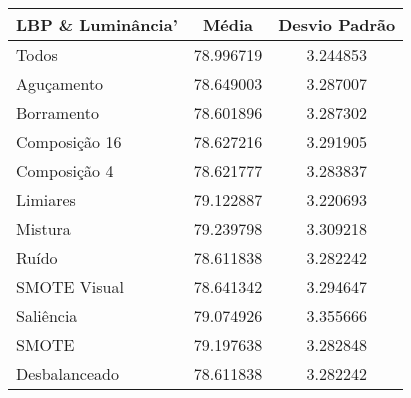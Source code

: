 \begin{table}[!htbp]
\centering
\caption{}
\label{tab:resultados:x:melhor}
\begin{tabular}{|l|c|c|}
\hline
\textbf{LBP  \& Luminância'} & \textbf{Média}     & \textbf{Desvio Padrão} \\ \hline
   Todos        &  78.996719 &  3.244853  \\ \hline
  Aguçamento    &  78.649003 &  3.287007  \\ \hline
  Borramento    &  78.601896 &  3.287302  \\ \hline
  Composição 16 &  78.627216 &  3.291905  \\ \hline
  Composição 4  &  78.621777 &  3.283837  \\ \hline
  Limiares      &  79.122887 &  3.220693  \\ \hline
  Mistura       &  79.239798 &  3.309218  \\ \hline
  Ruído         &  78.611838 &  3.282242  \\ \hline
  SMOTE Visual  &  78.641342 &  3.294647  \\ \hline
  Saliência     &  79.074926 &  3.355666  \\ \hline
 SMOTE          &  79.197638 &  3.282848  \\ \hline
Desbalanceado   &  78.611838 &  3.282242  \\ \hline
\end{tabular}
\end{table}




